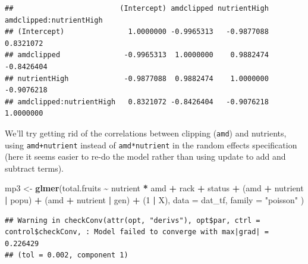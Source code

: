 \documentclass[
  12pt,
]{book}
\newenvironment{Shaded}{\begin{snugshade}}{\end{snugshade}}
\newcommand{\DataTypeTok}[1]{\textcolor[rgb]{0.13,0.29,0.53}{#1}}
\newcommand{\DecValTok}[1]{\textcolor[rgb]{0.00,0.00,0.81}{#1}}
\newcommand{\KeywordTok}[1]{\textcolor[rgb]{0.13,0.29,0.53}{\textbf{#1}}}
\newcommand{\NormalTok}[1]{#1}
\newcommand{\OperatorTok}[1]{\textcolor[rgb]{0.81,0.36,0.00}{\textbf{#1}}}
\newcommand{\StringTok}[1]{\textcolor[rgb]{0.31,0.60,0.02}{#1}}
\begin{document}
\begin{Shaded}
\end{Shaded}

\begin{verbatim}
##                         (Intercept) amdclipped nutrientHigh amdclipped:nutrientHigh
## (Intercept)               1.0000000 -0.9965313   -0.9877088               0.8321072
## amdclipped               -0.9965313  1.0000000    0.9882474              -0.8426404
## nutrientHigh             -0.9877088  0.9882474    1.0000000              -0.9076218
## amdclipped:nutrientHigh   0.8321072 -0.8426404   -0.9076218               1.0000000
\end{verbatim}

We'll try getting rid of the correlations between clipping (\texttt{amd}) and nutrients, using \texttt{amd+nutrient} instead of \texttt{amd*nutrient} in the random effects specification (here it seems easier to re-do the model rather than using update to add and subtract terms).

\begin{Shaded}
\begin{Highlighting}[]
\NormalTok{mp3 \textless{}{-}}\StringTok{ }\KeywordTok{glmer}\NormalTok{(total.fruits }\OperatorTok{\textasciitilde{}}\StringTok{ }\NormalTok{nutrient }\OperatorTok{*}\StringTok{ }\NormalTok{amd }\OperatorTok{+}
\StringTok{  }\NormalTok{rack }\OperatorTok{+}\StringTok{ }\NormalTok{status }\OperatorTok{+}
\StringTok{  }\NormalTok{(amd }\OperatorTok{+}\StringTok{ }\NormalTok{nutrient }\OperatorTok{|}\StringTok{ }\NormalTok{popu) }\OperatorTok{+}
\StringTok{  }\NormalTok{(amd }\OperatorTok{+}\StringTok{ }\NormalTok{nutrient }\OperatorTok{|}\StringTok{ }\NormalTok{gen) }\OperatorTok{+}\StringTok{ }\NormalTok{(}\DecValTok{1} \OperatorTok{|}\StringTok{ }\NormalTok{X),}
\DataTypeTok{data =}\NormalTok{ dat\_tf, }\DataTypeTok{family =} \StringTok{"poisson"}
\NormalTok{)}
\end{Highlighting}
\end{Shaded}

\begin{verbatim}
## Warning in checkConv(attr(opt, "derivs"), opt$par, ctrl = control$checkConv, : Model failed to converge with max|grad| = 0.226429
## (tol = 0.002, component 1)
\end{verbatim}
\end{document}
